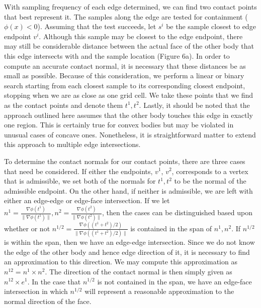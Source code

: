 \documentclass[9pt,twocolumn]{article}
\begin{document}
With sampling frequency of each edge determined, we can find two contact points that best represent it. The samples along the edge are tested for containment ($\phi(x) < 0$). Assuming that the test succeeds, let $s^i$ be the sample closest to edge endpoint $v^i$. 
Although this sample may be closest to the edge endpoint, there may still be considerable distance between the actual face of the other body that this edge intersects with and the sample location (Figure 6a). In order to compute an accurate contact normal, it is necessary that these distances be as small as possible. Because of this consideration, we perform a linear or binary search starting from each closest sample to its corresponding closest endpoint, stopping when we are as close as one grid cell. We take these points that we find as the contact points and denote them $t^1, t^2$. Lastly, it should be noted that the approach outlined here assumes that the other body touches this edge in exactly one region. This is certainly true for convex bodies but may be violated in unusual cases of concave ones. Nonetheless, it is straightforward matter to extend this approach to multiple edge intersections. \newline



To determine the contact normals for our contact points, there are three cases that need be considered. If either the endpoints, $v^1$, $v^2$, corresponds to a vertex that is admissible, we set both of the normals for $t^1,t^2$ to be the normal of the admissible endpoint. On the other hand, if neither is admissible, we are left with either an edge-edge or edge-face intersection. If we let $n^1 = \frac{\nabla \phi(t^1)}{\|\nabla \phi(t^1)\|}, n^2 = \frac{\nabla \phi(t^2)}{\|\nabla \phi(t^2)\|}$, then the cases can be distinguished based upon whether or not $n^{1/2} = \frac{\nabla \phi((t^1+t^2)/2)}{\|\nabla \phi((t^1 + t^2)/2)\|}$ is contained in the span of $n^1, n^2$. If $n^{1/2}$ is within the span, then we have an edge-edge intersection. Since we do not know the edge of the other body and hence edge direction of it, it is necessary to find an approximation to this direction. We may compute this approximation as $n^{12} = n^1 \times n^2$. The direction of the contact normal is then simply given as $n^{12} \times e^1$. In the case that $n^{1/2}$ is not contained in the span, we have an edge-face intersection in which $n^{1/2}$ will represent a reasonable approximation to the normal direction of the face. 
\end{document}
